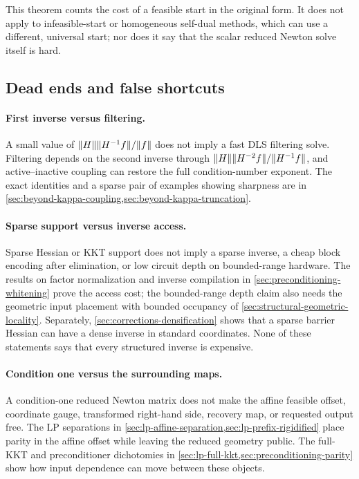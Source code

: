 This theorem counts the cost of a feasible start in the original form.  It
does not apply to infeasible-start or homogeneous self-dual methods, which
can use a different, universal start; nor does it say that the scalar reduced Newton
solve itself is hard.

\subsection{Dead ends and false shortcuts}
\label{sec:corrections-dead-ends}

\paragraph{First inverse versus filtering.}
A small value of
$\lVert H\rVert\lVert H^{-1}f\rVert/\lVert f\rVert$ does not imply a fast DLS filtering solve.
Filtering depends on the second inverse through
$\lVert H\rVert\lVert H^{-2}f\rVert/\lVert H^{-1}f\rVert$, and active--inactive coupling can
restore the full condition-number exponent.  The exact identities and a
sparse pair of examples showing sharpness are in
\cref{sec:beyond-kappa-coupling,sec:beyond-kappa-truncation}.

\paragraph{Sparse support versus inverse access.}
Sparse Hessian or KKT support does not imply a sparse inverse, a cheap block
encoding after elimination, or low circuit depth on bounded-range hardware.
The results on factor normalization and inverse compilation in
\cref{sec:preconditioning-whitening} prove the access cost; the bounded-range
depth claim also needs the geometric input placement with bounded occupancy
of \cref{sec:structural-geometric-locality}.  Separately,
\cref{sec:corrections-densification} shows that a sparse barrier Hessian
can have a dense inverse in standard coordinates.  None of these statements says that every structured inverse is
expensive.

\paragraph{Condition one versus the surrounding maps.}
A condition-one reduced Newton matrix does not make the affine feasible
offset, coordinate gauge, transformed right-hand side, recovery map, or
requested output free.  The LP separations in
\cref{sec:lp-affine-separation,sec:lp-prefix-rigidified} place parity in
the affine offset while leaving the reduced geometry public.  The full-KKT
and preconditioner dichotomies in
\cref{sec:lp-full-kkt,sec:preconditioning-parity} show how input dependence
can move between these objects.

